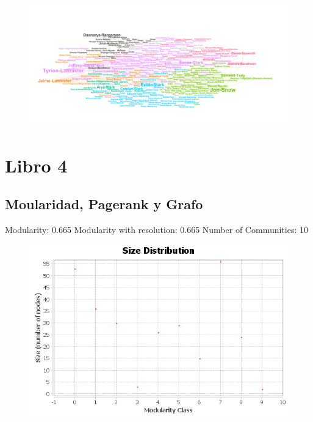\documentclass[]{article}
\begin{document}
\begin{figure}[htbp]  
\centering
\includegraphics{b3.png}
\end{figure}\newpage

\section{Libro 4}\label{libro-4}

\subsection{Moularidad, Pagerank y
Grafo}\label{moularidad-pagerank-y-grafo-3}

Modularity: 0.665 Modularity with resolution: 0.665 Number of
Communities: 10

\begin{figure}[htbp]  
\centering
\includegraphics{modb4/communities-size-distribution.png}
\end{figure}
\end{document}
